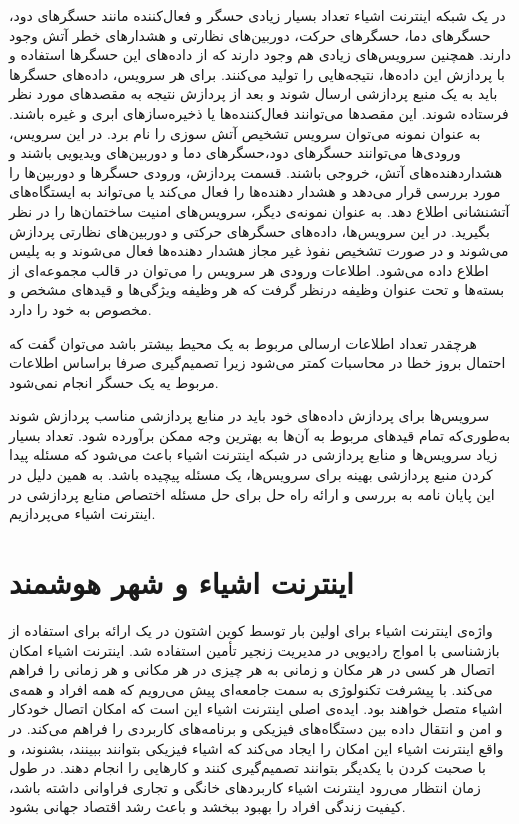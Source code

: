     در یک شبکه اینترنت اشیاء تعداد بسیار زیادی حسگر‌ و فعال‌کننده‌ مانند حسگر‌های دود، حسگر‌های دما، حسگر‌های حرکت، دوربین‌های نظارتی و هشدار‌های خطر آتش وجود دارند.
    همچنین سرویس‌های زیادی هم وجود دارند که از داده‌های این حسگر‌ها استفاده و با پردازش این داده‌ها، نتیجه‌هایی را تولید می‌کنند.
    برای هر سرویس، داده‌های حسگر‌ها باید به یک منبع پردازشی ارسال شوند و بعد از پردازش نتیجه به مقصد‌های مورد نظر فرستاده شوند.
    این مقصد‌ها می‌توانند فعال‌کننده‌ها یا ذخیره‌سازهای ابری و غیره باشند.
    به عنوان نمونه می‌توان سرویس تشخیص آتش سوزی را نام برد.
    در این سرویس، ورودی‌ها می‌توانند حسگر‌های دود،حسگرهای دما و دوربین‌های ویدیویی باشند و هشداردهنده‌‌های آتش، خروجی باشند.
    قسمت پردازش، ورودی حسگر‌ها و دوربین‌ها را مورد بررسی قرار می‌دهد و هشدار دهنده‌ها را فعال می‌کند یا می‌تواند به ایستگاه‌‌های آتشنشانی اطلاع دهد.  
    به عنوان نمونه‌ی دیگر، سرویس‌های امنیت ساختمان‌ها را در نظر بگیرید.
    در این سرویس‌ها، داده‌های حسگر‌های حرکتی و دوربین‌های نظارتی پردازش می‌شوند و در صورت تشخیص نفوذ غیر مجاز هشدار دهنده‌ها فعال می‌شوند و به پلیس اطلاع داده می‌شود.
    اطلاعات ورودی هر سرویس را می‌توان در قالب مجموعه‌ای از بسته‌ها و تحت عنوان وظیفه درنظر گرفت که هر وظیفه ویژگی‌ها و قیدهای مشخص و مخصوص به خود را دارد.
    
    هرچقدر تعداد اطلاعات ارسالی مربوط به یک محیط بیشتر باشد می‌توان گفت که احتمال بروز خطا در محاسبات کمتر می‌شود زیرا تصمیم‌گیری صرفا براساس اطلاعات مربوط یه یک حسگر انجام نمی‌شود.
    
    سرویس‌ها برای پردازش داده‌های خود باید در منابع پردازشی مناسب پردازش شوند به‌طوری‌که تمام قیدهای مربوط به آن‌ها به بهترین وجه ممکن برآورده شود. 
    تعداد بسیار زیاد سرویس‌ها و منابع پردازشی در شبکه اینترنت اشیاء باعث می‌شود که مسئله پیدا کردن منبع پردازشی بهینه برای سرویس‌ها، یک مسئله پیچیده باشد.
    به همین دلیل در این پایان نامه به بررسی و ارائه راه حل برای حل مسئله اختصاص منابع پردازشی در اینترنت اشیاء می‌پردازیم.

    \section{اینترنت اشیاء و شهر هوشمند}
    واژه‌ی اینترنت اشیاء برای اولین بار توسط کوین اشتون در یک ارائه برای استفاده از بازشناسی با امواج رادیویی در مدیریت زنجیر تأمین استفاده شد\cite{shton2009that}.
    اینترنت اشیاء امکان اتصال هر کسی در هر مکان و زمانی به هر چیزی در هر مکانی و هر زمانی را فراهم می‌کند.
    با پیشرفت تکنولوژی به سمت جامعه‌ای پیش می‌رویم که همه افراد و همه‌ی اشیاء متصل خواهند بود\cite{zheng2011internet}.
    ایده‌ی اصلی اینترنت اشیاء این است که امکان اتصال خودکار و امن و انتقال داده‌ بین دستگاه‌های فیزیکی و برنامه‌های کاربردی را فراهم می‌کند.
    در واقع اینترنت اشیاء این امکان را ایجاد می‌کند که اشیاء فیزیکی بتوانند ببینند، بشنوند، و با صحبت کردن با یکدیگر بتوانند تصمیم‌گیری کنند و کار‌هایی را انجام دهند\cite{al2015internet}.
    در طول زمان انتظار می‌رود اینترنت اشیاء کاربرد‌های خانگی و تجاری فراوانی داشته باشد، کیفیت زندگی افراد را بهبود ببخشد و باعث رشد اقتصاد جهانی بشود.

